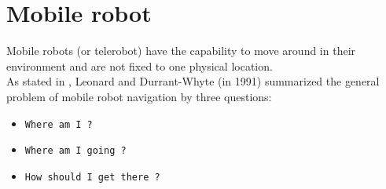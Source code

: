 \section{Mobile robot}
\label{intro:mobile}

Mobile robots (or telerobot) have the capability to move around
in their environment and are not fixed to one physical location.
\\
As stated in \cite{robot:whereami}, Leonard and Durrant-Whyte
(in 1991) summarized the general problem of mobile robot navigation
by three questions:

\begin{itemize}
\item \texttt{Where am I ?}
\item \texttt{Where am I going ?}
\item \texttt{How should I get there ?}
\end{itemize}

